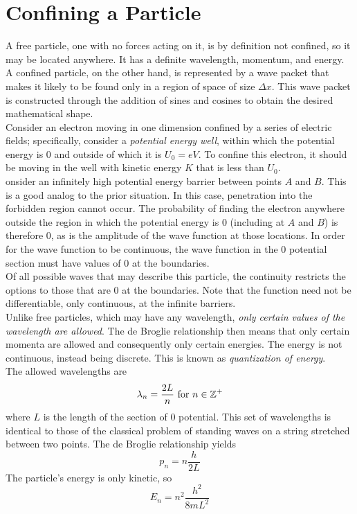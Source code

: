 \documentclass{subfiles}
\begin{document}
	\setcounter{section}{1}
	\section{Confining a Particle}
		A free particle, one with no forces acting on it, is by definition not confined, so it may be located anywhere. It has a definite wavelength, momentum, and energy. A confined particle, on the other hand, is represented by a wave packet that makes it likely to be found only in a region of space of size \(\Delta x\). This wave packet is constructed through the addition of sines and cosines to obtain the desired mathematical shape. \\
		Consider an electron moving in one dimension confined by a series of electric fields; specifically, consider a \textit{potential energy well}, within which the potential energy is 0 and outside of which it is \(U_0 = eV\). To confine this electron, it should be moving in the well with kinetic energy \(K\) that is less than \(U_0\). \\
			onsider an infinitely high potential energy barrier between points \(A\) and \(B\). This is a good analog to the prior situation. In this case, penetration into the forbidden region cannot occur. The probability of finding the electron anywhere outside the region in which the potential energy is 0 (including at \(A\) and \(B\)) is therefore 0, as is the amplitude of the wave function at those locations. In order for the wave function to be continuous, the wave function in the 0 potential section must have values of 0 at the boundaries. \\
			Of all possible waves that may describe this particle, the continuity restricts the options to those that are 0 at the boundaries. Note that the function need not be differentiable, only continuous, at the infinite barriers. \\
		Unlike free particles, which may have any wavelength, \textit{only certain values of the wavelength are allowed}. The de Broglie relationship then means that only certain momenta are allowed and consequently only certain energies. The energy is not continuous, instead being discrete. This is known as \textit{quantization of energy}. \\
			The allowed wavelengths are
			\[\lambda_n = \frac{2L}{n} \text{ for } n \in \mathbb{Z}^+\]
			where \(L\) is the length of the section of 0 potential. This set of wavelengths is identical to those of the classical problem of standing waves on a string stretched between two points. The de Broglie relationship yields
			\[p_n = n\frac{h}{2L}\]
			The particle's energy is only kinetic, so
			\[E_n = n^2\frac{h^2}{8mL^2}\]
\end{document}
